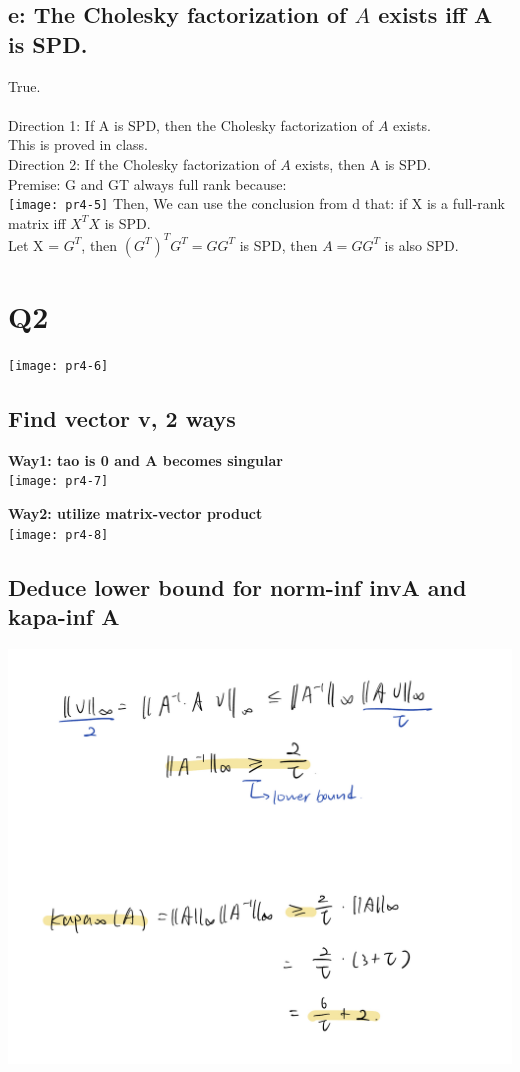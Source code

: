 \documentclass{article}
\begin{document}
\subsection{e: The Cholesky factorization of $A$ exists iff A is SPD.}
True.\\
\\
Direction 1: If A is SPD, then the Cholesky factorization of $A$ exists.\\
This is proved in class.\\

\noindent
Direction 2: If the Cholesky factorization of $A$ exists, then A is SPD.\\
Premise: G and GT always full rank because: \\
\texttt{[image: pr4-5]}
Then, We can use the conclusion from d that: if X is a full-rank matrix iff $X^TX$ is SPD.\\
Let X = $G^T$, then $(G^T)^TG^T = GG^T$ is SPD, then $A = GG^T$ is also SPD.\\

\pagebreak
\section{Q2}
\texttt{[image: pr4-6]}

\subsection{Find vector v, 2 ways}
\textbf{Way1: tao is 0 and A becomes singular}\\
\texttt{[image: pr4-7]}

\noindent
\textbf{Way2: utilize matrix-vector product}\\
\texttt{[image: pr4-8]}


\subsection{Deduce lower bound for norm-inf invA and kapa-inf A}
\includegraphics[width=1\linewidth]{pr4-9.jpeg}
\end{document}
